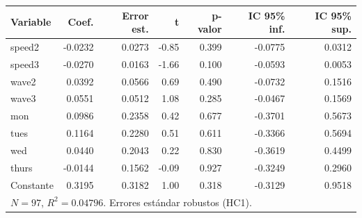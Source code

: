 
\begin{tabular}{lrrrrrr}
\toprule
Variable & Coef. & Error est. & t & p-valor & IC 95\% inf. & IC 95\% sup.\\
\midrule
speed2 & -0.0232 & 0.0273 & -0.85 & 0.399 & -0.0775 & 0.0312\\
speed3 & -0.0270 & 0.0163 & -1.66 & 0.100 & -0.0593 & 0.0053\\
wave2 & 0.0392 & 0.0566 & 0.69 & 0.490 & -0.0732 & 0.1516\\
wave3 & 0.0551 & 0.0512 & 1.08 & 0.285 & -0.0467 & 0.1569\\
mon & 0.0986 & 0.2358 & 0.42 & 0.677 & -0.3701 & 0.5673\\
tues & 0.1164 & 0.2280 & 0.51 & 0.611 & -0.3366 & 0.5694\\
wed & 0.0440 & 0.2043 & 0.22 & 0.830 & -0.3619 & 0.4499\\
thurs & -0.0144 & 0.1562 & -0.09 & 0.927 & -0.3249 & 0.2960\\
Constante & 0.3195 & 0.3182 & 1.00 & 0.318 & -0.3129 & 0.9518\\
\midrule
\multicolumn{7}{l}{$N=97$, $R^2=0.04796$. Errores estándar robustos (HC1).}\\
\bottomrule
\end{tabular}
